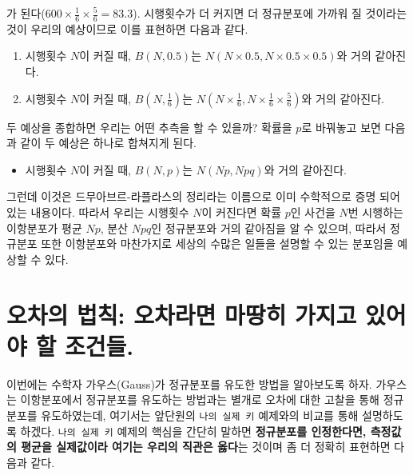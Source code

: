 \documentclass[]{book}
\providecommand{\tightlist}{%
  \setlength{\itemsep}{0pt}\setlength{\parskip}{0pt}}
\begin{document}
가 된다(\(600\times \frac{1}{6} \times \frac{5}{6}=83.3\)). 시행횟수가 더 커지면 더 정규분포에 가까워 질 것이라는 것이 우리의 예상이므로 이를 표현하면 다음과 같다.

\begin{enumerate}
\def\labelenumi{\arabic{enumi}.}
\tightlist
\item
  시행횟수 \(N\)이 커질 때, \(B(N,0.5)\)는 \(N(N \times 0.5, N \times 0.5 \times 0.5)\)와 거의 같아진다.
\item
  시행횟수 \(N\)이 커질 때, \(B(N,\frac{1}{6})\)는 \(N(N \times \frac{1}{6}, N \times \frac{1}{6} \times \frac{5}{6})\)와 거의 같아진다.
\end{enumerate}

두 예상을 종합하면 우리는 어떤 추측을 할 수 있을까? 확률을 \(p\)로 바꿔놓고 보면 다음과 같이 두 예상은 하나로 합쳐지게 된다.

\begin{itemize}
\tightlist
\item
  시행횟수 \(N\)이 커질 때, \(B(N,p)\)는 \(N(Np, Npq)\)와 거의 같아진다.
\end{itemize}

그런데 이것은 드무아브르-라플라스의 정리라는 이름으로 이미 수학적으로 증명 되어 있는 내용이다.
따라서 우리는 시행횟수 \(N\)이 커진다면 확률 \(p\)인 사건을 \(N\)번 시행하는 이항분포가 평균 \(Np\), 분산 \(Npq\)인 정규분포와 거의 같아짐을 알 수 있으며, 따라서 정규분포 또한 이항분포와 마찬가지로 세상의 수많은 일들을 설명할 수 있는 분포임을 예상할 수 있다.

\hypertarget{uxc624uxcc28uxc758-uxbc95uxce59-uxc624uxcc28uxb77cuxba74-uxb9c8uxb545uxd788-uxac00uxc9c0uxace0-uxc788uxc5b4uxc57c-uxd560-uxc870uxac74uxb4e4.}{%
\section{오차의 법칙: 오차라면 마땅히 가지고 있어야 할 조건들.}\label{uxc624uxcc28uxc758-uxbc95uxce59-uxc624uxcc28uxb77cuxba74-uxb9c8uxb545uxd788-uxac00uxc9c0uxace0-uxc788uxc5b4uxc57c-uxd560-uxc870uxac74uxb4e4.}}

이번에는 수학자 가우스(Gauss)가 정규분포를 유도한 방법을 알아보도록 하자. 가우스는 이항분포에서 정규분포를 유도하는 방법과는 별개로 오차에 대한 고찰을 통해 정규분포를 유도하였는데, 여기서는 앞단원의 \texttt{나의\ 실제\ 키} 예제와의 비교를 통해 설명하도록 하겠다. \texttt{나의\ 실제\ 키} 예제의 핵심을 간단히 말하면 \textbf{정규분포를 인정한다면, 측정값의 평균을 실제값이라 여기는 우리의 직관은 옳다}는 것이며 좀 더 정확히 표현하면 다음과 같다.
\end{document}
